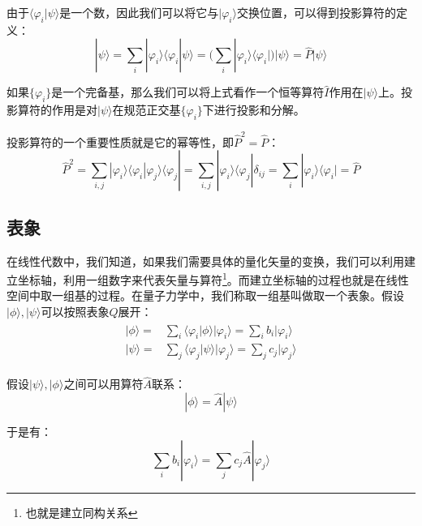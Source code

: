     由于$\langle\varphi_i|\psi\rangle$是一个数，因此我们可以将它与$|\varphi_i\rangle$交换位置，可以得到投影算符的定义：
    \begin{equation}
        |\psi\rangle=\sum_i|\varphi_i\rangle\langle\varphi_i|\psi\rangle=\Big(\sum_i|\varphi_i\rangle\langle\varphi_i|\Big)|\psi\rangle=\hat{P}|\psi\rangle
    \end{equation}
    
    如果$\{\varphi_i\}$是一个完备基，那么我们可以将上式看作一个恒等算符$\hat{I}$作用在$|\psi\rangle$上。投影算符的作用是对$|\psi\rangle$在规范正交基$\{\varphi_i\}$下进行投影和分解。
    
    投影算符的一个重要性质就是它的幂等性，即$\hat{P}^2=\hat{P}$：
    \begin{equation}
        \hat{P}^2=\sum_{i,j}|\varphi_i\rangle\langle\varphi_i|\varphi_j\rangle\langle\varphi_j|=\sum_{i,j}|\varphi_i\rangle\langle\varphi_j|\delta_{ij}=\sum_i|\varphi_i\rangle\langle\varphi_i|=\hat{P}
    \end{equation}
    
    \subsection{表象}
    在线性代数中，我们知道，如果我们需要具体的量化矢量的变换，我们可以利用建立坐标轴，利用一组数字来代表矢量与算符\footnote{也就是建立同构关系}。而建立坐标轴的过程也就是在线性空间中取一组基的过程。在量子力学中，我们称取一组基叫做取一个表象。假设$|\phi\rangle,|\psi\rangle$可以按照表象$Q$展开：
    \begin{align}
        \begin{split}
            |\phi\rangle=&\sum_i\langle\varphi_i|\phi\rangle|\varphi_i\rangle=\sum_i b_i|\varphi_i\rangle\\
            |\psi\rangle=&\sum_j\langle\varphi_j|\psi\rangle|\varphi_j\rangle=\sum_j c_j|\varphi_j\rangle
        \end{split}
    \end{align}
    
    假设$|\psi\rangle,|\phi\rangle$之间可以用算符$\hat{A}$联系：
    \begin{equation}
        |\phi\rangle=\hat{A}|\psi\rangle
    \end{equation}
    
    于是有：
    \begin{equation}
        \sum_i b_i|\varphi_i\rangle=\sum_j c_j\hat{A}|\varphi_j\rangle
    \end{equation}
    
